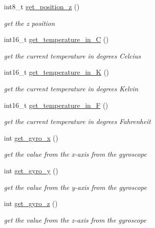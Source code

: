 \begin{DoxyCompactItemize}
int8\+\_\+t \hyperlink{classmpu6050_aaac23fed6c6abfc50a5e41c5fdcd22e8}{get\+\_\+position\+\_\+z} ()
\begin{DoxyCompactList}\small\item\em get the z position \end{DoxyCompactList}\item 
int16\+\_\+t \hyperlink{classmpu6050_ab4e29f1ab6bd4ed7aa4f6ba0a4874c6a}{get\+\_\+temperature\+\_\+in\+\_\+C} ()
\begin{DoxyCompactList}\small\item\em get the current temperature in degrees Celcius \end{DoxyCompactList}\item 
int16\+\_\+t \hyperlink{classmpu6050_a8cce3546551572c7518962c193183a17}{get\+\_\+temperature\+\_\+in\+\_\+K} ()
\begin{DoxyCompactList}\small\item\em get the current temperature in degrees Kelvin \end{DoxyCompactList}\item 
int16\+\_\+t \hyperlink{classmpu6050_a3dd7248a256c2d7f7f465fdc5e4e5da8}{get\+\_\+temperature\+\_\+in\+\_\+F} ()
\begin{DoxyCompactList}\small\item\em get the current temperature in degrees Fahrenheit \end{DoxyCompactList}\item 
\mbox{\label{classmpu6050_aec7d7275fdb79b4c2e76dea2cdb99763}} 
int \hyperlink{classmpu6050_aec7d7275fdb79b4c2e76dea2cdb99763}{get\+\_\+gyro\+\_\+x} ()
\begin{DoxyCompactList}\small\item\em get the value from the x-\/axis from the gyroscope \end{DoxyCompactList}\item 
\mbox{\label{classmpu6050_ad02ed5082341b88fe8f0231bcfe41b99}} 
int \hyperlink{classmpu6050_ad02ed5082341b88fe8f0231bcfe41b99}{get\+\_\+gyro\+\_\+y} ()
\begin{DoxyCompactList}\small\item\em get the value from the y-\/axis from the gyroscope \end{DoxyCompactList}\item 
\mbox{\label{classmpu6050_aa81a142fcb1ba3a3275bf9e2852434d6}} 
int \hyperlink{classmpu6050_aa81a142fcb1ba3a3275bf9e2852434d6}{get\+\_\+gyro\+\_\+z} ()
\begin{DoxyCompactList}\small\item\em get the value from the z-\/axis from the gyroscope \end{DoxyCompactList}\end{DoxyCompactItemize}


